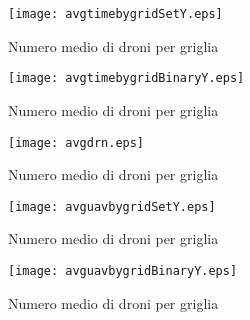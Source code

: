 %
%
\begin{figure}
	\begin{center}
		\texttt{[image: avgtimebygridSetY.eps]}
	\end{center}
	\caption{Numero medio di droni per griglia} \label{fig:avgtimebygridSetY}
\end{figure}
%
%
\begin{figure}
	\begin{center}
		\texttt{[image: avgtimebygridBinaryY.eps]}
	\end{center}
	\caption{Numero medio di droni per griglia} \label{fig:avgtimebygridBinaryY}
\end{figure}
%


%
\begin{figure}
	\begin{center}
		\texttt{[image: avgdrn.eps]}
	\end{center}
	\caption{Numero medio di droni per griglia} \label{fig:avgdrn}
\end{figure}
%
%
\begin{figure}
	\begin{center}
		\texttt{[image: avguavbygridSetY.eps]}
	\end{center}
	\caption{Numero medio di droni per griglia} \label{fig:avguavbygridSetY}
\end{figure}
%
%
\begin{figure}
	\begin{center}
		\texttt{[image: avguavbygridBinaryY.eps]}
	\end{center}
	\caption{Numero medio di droni per griglia} \label{fig:avguavbygridBinaryY}
\end{figure}
%


